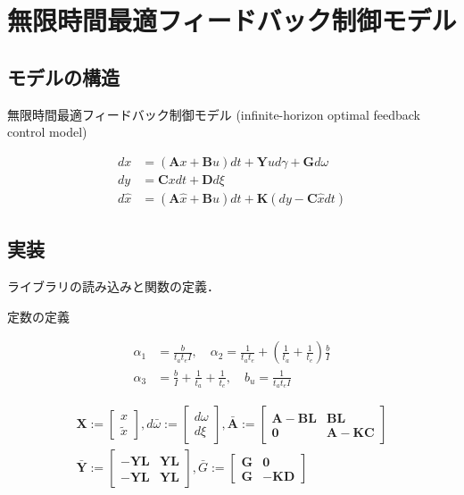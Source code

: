 \section{無限時間最適フィードバック制御モデル}
\subsection{モデルの構造}
無限時間最適フィードバック制御モデル (infinite-horizon optimal feedback control model) \cite{Qian2013-zy}


\begin{align}
d x&=(\mathbf{A} x+\mathbf{B} u) dt +\mathbf{Y} u d \gamma+\mathbf{G} d \omega \\
d y&=\mathbf{C} x dt+\mathbf{D} d \xi\\
d \hat{x}&=(\mathbf{A} \hat{x}+\mathbf{B} u) dt+\mathbf{K}(dy-\mathbf{C} \hat{x} dt)
\end{align}
\subsection{実装}
ライブラリの読み込みと関数の定義．

定数の定義


\begin{align}
\alpha_{1}&=\frac{b}{t_{a} t_{e} I},\quad \alpha_{2}=\frac{1}{t_{a} t_{e}}+\left(\frac{1}{t_{a}}+\frac{1}{t_{e}}\right) \frac{b}{I} \\
\alpha_{3}&=\frac{b}{I}+\frac{1}{t_{a}}+\frac{1}{t_{e}},\quad b_{u}=\frac{1}{t_{a} t_{e} I}
\end{align}


\begin{align}
\mathbf{X}:=\left[\begin{array}{l}
x \\
\tilde{x}
\end{array}\right], d \bar{\omega} :=\left[\begin{array}{c}
d \omega \\
d \xi
\end{array}\right], \bar{\mathbf{A}} :=\left[\begin{array}{cc}
\mathbf{A}-\mathbf{B} \mathbf{L} & \mathbf{B} \mathbf{L} \\
\mathbf{0} & \mathbf{A}-\mathbf{K} \mathbf{C}
\end{array}\right] \\
\bar{\mathbf{Y}} :=\left[\begin{array}{cc}
-\mathbf{Y} \mathbf{L} & \mathbf{Y} \mathbf{L} \\
-\mathbf{Y} \mathbf{L} & \mathbf{Y} \mathbf{L}
\end{array}\right], \bar{G} :=\left[\begin{array}{cc}
\mathbf{G} & \mathbf{0} \\
\mathbf{G} & -\mathbf{K} \mathbf{D}
\end{array}\right]
\end{align}


